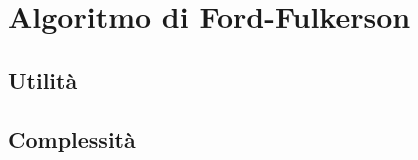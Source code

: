 \documentclass[\main/main.tex]{subfiles}
\begin{document}
\chapter{Algoritmo di Ford-Fulkerson}
\section{Utilità}
\section{Complessità}
\end{document}
